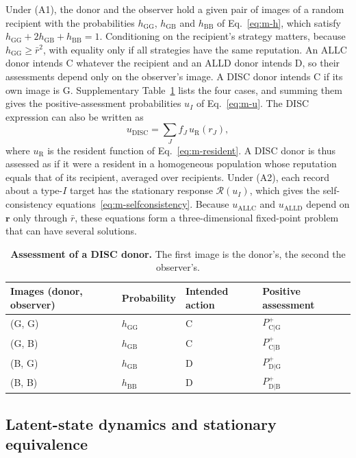 \documentclass[10pt]{wlscirep}
\newcommand{\Rmap}{\mathscr{R}}            %
\newcommand{\Pp}[1]{P^{+}_{\mathrm{#1}}}   %
\newcommand{\ALLC}{\mathrm{ALLC}}
\newcommand{\ALLD}{\mathrm{ALLD}}
\newcommand{\DISC}{\mathrm{DISC}}
\theoremstyle{plain}
\theoremstyle{remark}
\begin{document}
Under (A1), the donor and the observer hold a given pair of images of a random recipient with the probabilities $h_{\mathrm{GG}}$, $h_{\mathrm{GB}}$ and $h_{\mathrm{BB}}$ of Eq.~\eqref{eq:m-h}, which satisfy $h_{\mathrm{GG}}+2h_{\mathrm{GB}}+h_{\mathrm{BB}}=1$. Conditioning on the recipient's strategy matters, because $h_{\mathrm{GG}}\geq\bar r^2$, with equality only if all strategies have the same reputation. An ALLC donor intends C whatever the recipient and an ALLD donor intends D, so their assessments depend only on the observer's image. A DISC donor intends C if its own image is G. Supplementary Table~\ref{tab:si-disc} lists the four cases, and summing them gives the positive-assessment probabilities $u_I$ of Eq.~\eqref{eq:m-u}. The DISC expression can also be written as
\begin{equation}
u_{\DISC}=\sum_Jf_J\,u_{\mathrm R}(r_J),
\label{eq:s-udisc}
\end{equation}
where $u_{\mathrm R}$ is the resident function of Eq.~\eqref{eq:m-resident}. A DISC donor is thus assessed as if it were a resident in a homogeneous population whose reputation equals that of its recipient, averaged over recipients. Under (A2), each record about a type-$I$ target has the stationary response $\Rmap(u_I)$, which gives the self-consistency equations~\eqref{eq:m-selfconsistency}. Because $u_{\ALLC}$ and $u_{\ALLD}$ depend on $\bm r$ only through $\bar r$, these equations form a three-dimensional fixed-point problem that can have several solutions.

\begin{table}[!htbp]
\centering
\caption{\textbf{Assessment of a DISC donor.} The first image is the donor's, the second the observer's.}
\label{tab:si-disc}
\small
\begin{tabular}{@{}llll@{}}
\toprule
Images (donor, observer) & Probability & Intended action & Positive assessment\\
\midrule
(G, G) & $h_{\mathrm{GG}}$ & C & $\Pp{C|G}$\\
(G, B) & $h_{\mathrm{GB}}$ & C & $\Pp{C|B}$\\
(B, G) & $h_{\mathrm{GB}}$ & D & $\Pp{D|G}$\\
(B, B) & $h_{\mathrm{BB}}$ & D & $\Pp{D|B}$\\
\bottomrule
\end{tabular}
\end{table}

\subsection{Latent-state dynamics and stationary equivalence}
\end{document}
